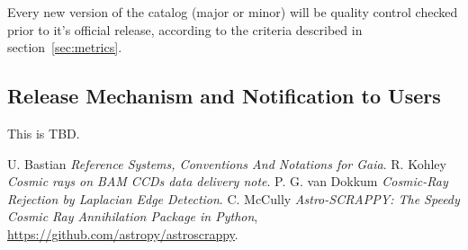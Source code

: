 \documentclass[a4paper, 11pt]{article}
\begin{document}
Every new version of the catalog (major or minor) will be quality control checked prior to it's official release, according to the criteria described in section~\ref{sec:metrics}.

\subsection{Release Mechanism and Notification to Users}

This is TBD.


\begin{thebibliography}{9}
 U. Bastian \emph{Reference Systems, Conventions And Notations for Gaia}.
 R. Kohley \emph{Cosmic rays on BAM CCDs data delivery note}.
 P. G. van Dokkum \emph{Cosmic-Ray Rejection by Laplacian Edge Detection}.
 C. McCully \emph{Astro-SCRAPPY: The Speedy Cosmic Ray Annihilation Package in Python}, \url{https://github.com/astropy/astroscrappy}.


\end{thebibliography}
\end{document}
